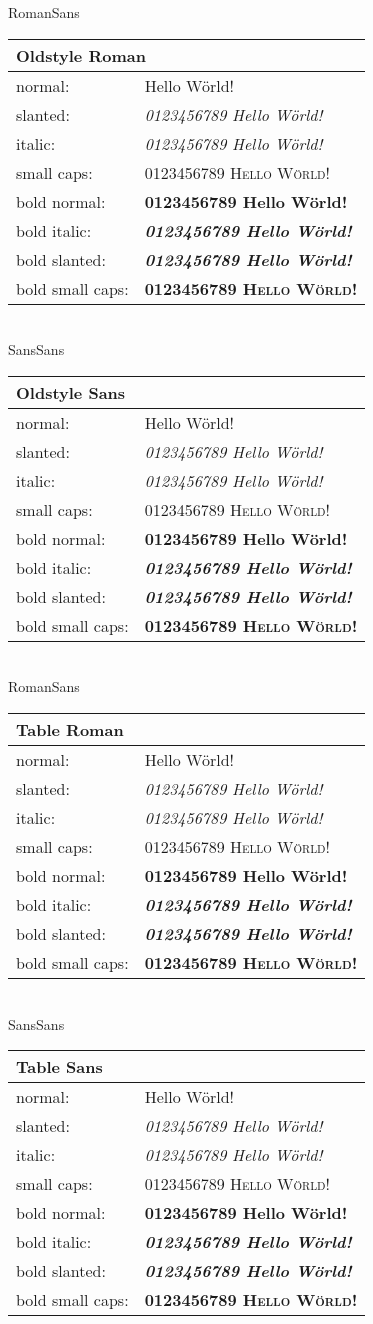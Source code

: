 \documentclass{article}
\def\text{0123456789 Hello Wörld! }
\let\SL\textsl
\let\IT\textit
\let\SC\textsc
\let\B\textbf
\newcommand{\test}[2]{%
   \def\Fam{Sans}\def\Arg{#2}
   \ifx\Arg\Fam\let\Fam\sf\else\let\Fam\relax\fi
   \begin{tabular}{ll}
      \multicolumn{2}{l}{#1 #2}\\\hline
      normal:          & \Fam\text\\ 
      slanted:         & \Fam\SL{\text}\\ 
      italic:          & \Fam\IT{\text}\\ 
      small caps:      & \Fam\SC{\text}\\ 
      bold normal:     & \Fam\B{\text}\\
      bold italic:     & \Fam\B{\IT{\text}}\\
      bold slanted:    & \Fam\B{\SL{\text}}\\
      bold small caps: & \Fam\B{\SC{\text}}\\
   \end{tabular}\\[2ex]
}
\begin{document}
\test{Oldstyle}{Roman}
\test{Oldstyle}{Sans}
\tbfigures
\test{Table}   {Roman}
\test{Table}   {Sans}
\end{document}
